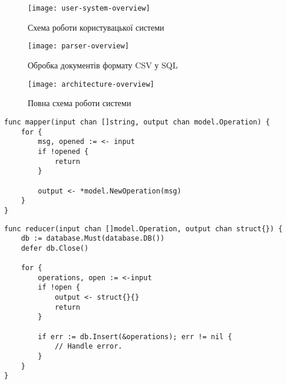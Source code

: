 \chapter{}

\begin{figure}[h]
\centering
\texttt{[image: user-system-overview]}
\caption{Схема роботи користувацької системи}
\label{fig:user-system-overview}
\end{figure}

\begin{figure}[h]
\centering
\texttt{[image: parser-overview]}
\caption{Обробка документів формату CSV у SQL}
\label{fig:parser-overview}
\end{figure}

\begin{figure}[h]
\centering
\texttt{[image: architecture-overview]}
\caption{Повна схема роботи системи}
\label{fig:architecture-overview}
\end{figure}

\pagebreak

\begin{lstlisting}[caption={Реалізація функції Map.},captionpos=b]
func mapper(input chan []string, output chan model.Operation) {
	for {
		msg, opened := <- input
		if !opened {
			return
		}

		output <- *model.NewOperation(msg)
	}
}
\end{lstlisting}

\begin{lstlisting}[caption={Реалізація функції Reduce.},captionpos=b]
func reducer(input chan []model.Operation, output chan struct{}) {
	db := database.Must(database.DB())
	defer db.Close()

	for {
		operations, open := <-input
		if !open {
			output <- struct{}{}
			return
		}

		if err := db.Insert(&operations); err != nil {
			// Handle error.
		}
	}
}
\end{lstlisting}
